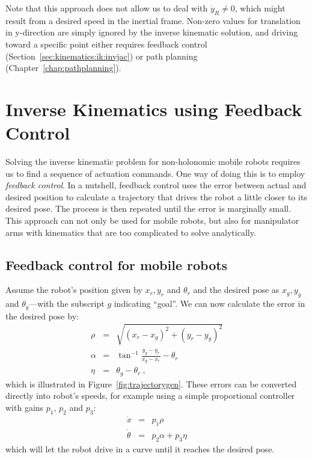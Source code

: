 Note that this approach does not allow us to deal with $\dot{y}_R \neq 0$, which might result from a desired speed in the inertial frame. Non-zero values for translation in y-direction are simply ignored by the inverse kinematic solution, and driving toward a specific point either requires feedback control (Section~\ref{sec:kinematics:ik:invjac}) or path planning (Chapter~\ref{chap:pathplanning}).

\section{Inverse Kinematics using Feedback Control}\label{sec:kinematics:inverse:feedbackcontrol}

Solving the inverse kinematic problem for non-holonomic mobile robots requires us to find a sequence of actuation commands.
One way of doing this is to employ \emph{feedback control}.
In a nutshell, feedback control uses the error between actual and desired position to calculate a trajectory that drives the robot a little closer to its desired pose. The process is then repeated until the error is marginally small.
This approach can not only be used for mobile robots, but also for manipulator arms with kinematics that are too complicated to solve analytically.

\subsection{Feedback control for mobile robots}\label{sec:fbmobile}

Assume the robot's position given by $x_r, y_r$ and $\theta_r$ and the desired pose as $x_g, y_g$ and $\theta_g$---with the subscript $g$ indicating ``goal''.
We can now calculate the error in the desired pose by:
\begin{eqnarray}
\rho  &=& \sqrt{(x_r-x_g)^2+(y_r-y_g)^2} \nonumber \\
\alpha&=& \tan^{-1}{\frac{y_g-y_r}{x_g-x_r}}-\theta_r \\
\eta  &=& \theta_g-\theta_r\ , \nonumber
\end{eqnarray}
which is illustrated in Figure~\ref{fig:trajectorygen}.
These errors can be converted directly into robot's speeds, for example using a simple proportional controller with gains $p_1$, $p_2$ and $p_3$:
\begin{eqnarray}
\dot{x} &=& p_1 \rho\\
\dot{\theta} &=& p_2 \alpha + p_3 \eta
\end{eqnarray}
which will let the robot drive in a curve until it reaches the desired pose.


